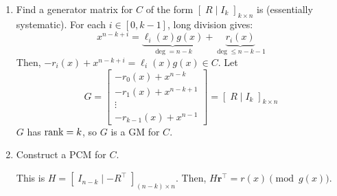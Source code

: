 \begin{enumerate}[label=(\roman*)]
    \item Find a generator matrix for $ C $ of the form
          $\left[ \; R\mid I_k\; \right]_{k\times n}$ is (essentially systematic).
          For each $ i\in [0,k-1] $, long division gives:
          \[ x^{n-k+i}=
              \underbrace{\ell_i(x)g(x)}_{\deg=n-k}+\underbrace{r_i(x)}_{\deg\leqslant n-k-1} \]
          Then, $ -r_i(x)+x^{n-k+i}=\ell_i(x)g(x)\in C $.
          Let
          \[ G=
              \begin{bmatrix}
                  -r_0(x)+x^{n-k}   \\
                  -r_1(x)+x^{n-k+1} \\
                  \vdots            \\
                  -r_{k-1}(x)+x^{n-1}
              \end{bmatrix}=\left[ \; R\mid I_k\; \right]_{k\times n}\]
          $ G $ has $ \operatorname{rank}=k $, so $ G $ is a GM for $ C $.

    \item Construct a PCM for $ C $.

          This is $ H=\left[ \; I_{n-k}\mid -R^{\top}\; \right]_{(n-k)\times n} $.
          Then, $ H\symbf{r}^\top=r(x)\pmod{g(x)} $.
\end{enumerate}
